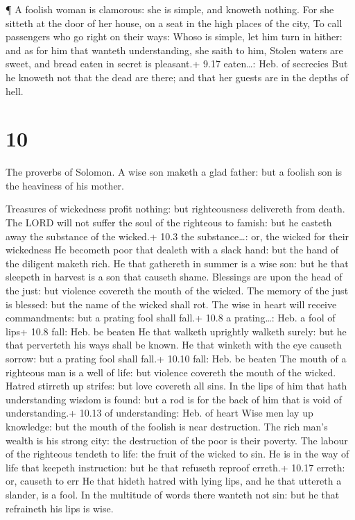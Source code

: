  ¶ A foolish woman is clamorous: she is simple, and knoweth
nothing.  For she sitteth at the door of her house, on a
seat in the high places of the city,  To call passengers
who go right on their ways:  Whoso is simple, let him turn
in hither: and as for him that wanteth understanding, she saith to him,
 Stolen waters are sweet, and bread eaten in secret is
pleasant.+ 9.17 eaten\ldots: Heb. of secrecies  But he
knoweth not that the dead are there; and that her guests are in the
depths of hell.

\hypertarget{section-9}{%
\section{10}\label{section-9}}

 The proverbs of Solomon. A wise son maketh a glad father:
but a foolish son is the heaviness of his mother.

 Treasures of wickedness profit nothing: but righteousness
delivereth from death.  The LORD will not suffer the soul of
the righteous to famish: but he casteth away the substance of the
wicked.+ 10.3 the substance\ldots: or, the wicked for their wickedness
 He becometh poor that dealeth with a slack hand: but the
hand of the diligent maketh rich.  He that gathereth in
summer is a wise son: but he that sleepeth in harvest is a son that
causeth shame.  Blessings are upon the head of the just: but
violence covereth the mouth of the wicked.  The memory of
the just is blessed: but the name of the wicked shall rot. 
The wise in heart will receive commandments: but a prating fool shall
fall.+ 10.8 a prating\ldots: Heb. a fool of lips+ 10.8 fall: Heb. be
beaten  He that walketh uprightly walketh surely: but he
that perverteth his ways shall be known.  He that winketh
with the eye causeth sorrow: but a prating fool shall fall.+ 10.10 fall:
Heb. be beaten  The mouth of a righteous man is a well of
life: but violence covereth the mouth of the wicked. 
Hatred stirreth up strifes: but love covereth all sins.  In
the lips of him that hath understanding wisdom is found: but a rod is
for the back of him that is void of understanding.+ 10.13 of
understanding: Heb. of heart  Wise men lay up knowledge:
but the mouth of the foolish is near destruction.  The rich
man's wealth is his strong city: the destruction of the poor is their
poverty.  The labour of the righteous tendeth to life: the
fruit of the wicked to sin.  He is in the way of life that
keepeth instruction: but he that refuseth reproof erreth.+ 10.17 erreth:
or, causeth to err  He that hideth hatred with lying lips,
and he that uttereth a slander, is a fool.  In the
multitude of words there wanteth not sin: but he that refraineth his
lips is wise.

